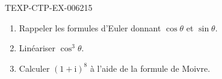 \begin{exercice}{TEXP-CTP-EX-006}{2}{15}
\begin{enumerate}
  \item Rappeler les formules d'Euler donnant $\cos\theta$ et $\sin\theta$.
  \item Linéariser $\cos^3\theta$.
  \item Calculer $(1+\mathrm{i})^{8}$ à l'aide de la formule de Moivre.
\end{enumerate}
\end{exercice}

